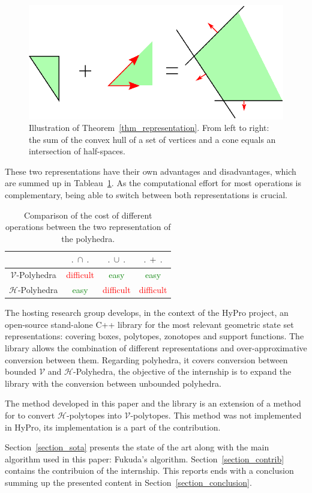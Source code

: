 \begin{figure}
\includegraphics[scale=1]{images/poly.eps}
\caption{Illustration of Theorem~\ref{thm_representation}. From left to right: the sum of the convex hull of a set of vertices and a cone equals an intersection of half-spaces.}
\end{figure}

These two representations have their own advantages and disadvantages, which are summed up  in Tableau~\ref{comparison tab}. As the computational effort for most operations is complementary, being able to switch between both representations is crucial.

\begin{table}
\begin{tabular}{| c | c | c | c |}
	\hline	
				    & $.\ \cap\ .$ & $.\ \cup\ .$ & $.\ +\ .$ \\ \hline
	$\mathcal{V}$-Polyhedra   & \textcolor{red}{difficult} & \textcolor{green}{easy} & \textcolor{green}{easy} \\ \hline
   	$\mathcal{H}$-Polyhedra   & \textcolor{green}{easy} & \textcolor{red}{difficult} & \textcolor{red}{difficult}\\ \hline
\end{tabular}
\caption{Comparison of the cost of different operations between the two representation of the polyhedra.}
\label{comparison tab}
\end{table}

The hosting research group develops, in the context of the HyPro project, an open-source stand-alone C++ library for the most relevant geometric state set representations: covering boxes, polytopes, zonotopes and support functions. 
The library allows the combination of different representations and over-approximative conversion between them. Regarding polyhedra, it covers conversion between bounded $\mathcal{V}$ and $\mathcal{H}$-Polyhedra, the objective of the internship is to expand the library with the conversion between unbounded polyhedra.

The method developed in this paper and the library is an extension of a method for to convert $\mathcal{H}$-polytopes into $\mathcal{V}$-polytopes. This method was not implemented in HyPro, its implementation is a part of the contribution.

Section~\ref{section_sota} presents the state of the art along with the main algorithm used in this paper: Fukuda's algorithm. Section~\ref{section_contrib} contains the contribuion of the internship. This reports ends with a conclusion summing up the presented content in Section~\ref{section_conclusion}. 



